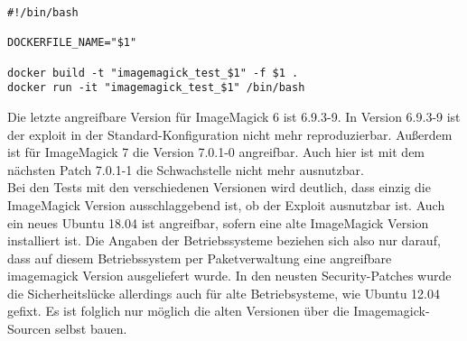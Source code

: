 \begin{lstlisting}[language=Text, caption=Script debug.sh in Testsuite,label={lst:testsuitedebugcall}]
#!/bin/bash

DOCKERFILE_NAME="$1"

docker build -t "imagemagick_test_$1" -f $1 .
docker run -it "imagemagick_test_$1" /bin/bash
\end{lstlisting}
\vspace{5mm}


Die letzte angreifbare Version für ImageMagick 6 ist 6.9.3-9.
In Version 6.9.3-9 ist der exploit in der Standard-Konfiguration nicht mehr reproduzierbar.
Außerdem ist für ImageMagick 7 die Version 7.0.1-0 angreifbar.
Auch hier ist mit dem nächsten Patch 7.0.1-1 die Schwachstelle nicht mehr ausnutzbar.\\

Bei den Tests mit den verschiedenen Versionen wird deutlich, dass einzig die ImageMagick Version ausschlaggebend ist,
ob der Exploit ausnutzbar ist.
Auch ein neues Ubuntu 18.04 ist angreifbar, sofern eine alte ImageMagick Version installiert ist.
Die Angaben der Betriebssysteme beziehen sich also nur darauf,
dass auf diesem Betriebssystem per Paketverwaltung eine angreifbare imagemagick Version ausgeliefert wurde.
In den neusten Security-Patches wurde die Sicherheitslücke allerdings auch für alte Betriebsysteme, wie Ubuntu 12.04 gefixt.
Es ist folglich nur möglich die alten Versionen über die Imagemagick-Sourcen selbst bauen.